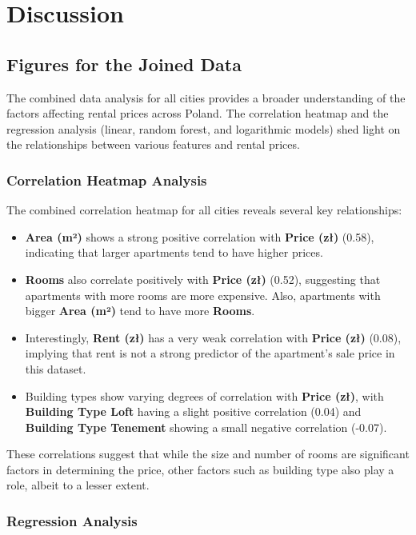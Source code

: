 \section{Discussion}

\subsection{Figures for the Joined Data}
The combined data analysis for all cities provides a broader understanding of the factors affecting rental prices across Poland. The correlation heatmap and the regression analysis (linear, random forest, and logarithmic models) shed light on the relationships between various features and rental prices.

\subsubsection{Correlation Heatmap Analysis}
The combined correlation heatmap for all cities reveals several key relationships:
\begin{itemize}
    \item \textbf{Area (m²)} shows a strong positive correlation with \textbf{Price (zł)} (0.58), indicating that larger apartments tend to have higher prices.
    \item \textbf{Rooms} also correlate positively with \textbf{Price (zł)} (0.52), suggesting that apartments with more rooms are more expensive. Also, apartments with bigger \textbf{Area (m²)} tend to have more \textbf{Rooms}.
    \item Interestingly, \textbf{Rent (zł)} has a very weak correlation with \textbf{Price (zł)} (0.08), implying that rent is not a strong predictor of the apartment's sale price in this dataset.
    \item Building types show varying degrees of correlation with \textbf{Price (zł)}, with \textbf{Building Type Loft} having a slight positive correlation (0.04) and \textbf{Building Type Tenement} showing a small negative correlation (-0.07).
\end{itemize}
These correlations suggest that while the size and number of rooms are significant factors in determining the price, other factors such as building type also play a role, albeit to a lesser extent.

\subsubsection{Regression Analysis}

